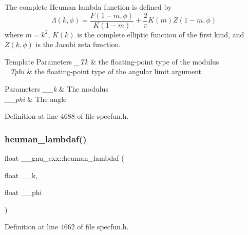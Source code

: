 The complete Heuman lambda function is defined by \[ \Lambda(k,\phi) = \frac{F(1-m,\phi)}{K(1-m)} + \frac{2}{\pi} K(m) Z(1-m,\phi) \] where $ m = k^2 $, $ K(k) $ is the complete elliptic function of the first kind, and $ Z(k,\phi) $ is the Jacobi zeta function.


\begin{DoxyTemplParams}{Template Parameters}
{\em \+\_\+\+Tk} & the floating-\/point type of the modulus \\
\hline
{\em \+\_\+\+Tphi} & the floating-\/point type of the angular limit argument \\
\hline
\end{DoxyTemplParams}

\begin{DoxyParams}{Parameters}
{\em \+\_\+\+\_\+k} & The modulus \\
\hline
{\em \+\_\+\+\_\+phi} & The angle \\
\hline
\end{DoxyParams}


Definition at line 4688 of file specfun.\+h.

\mbox{\label{group__mathsf__gnu_ga10cf5d54d985aa3a58cb197601040ac8}} 
\subsubsection{\texorpdfstring{heuman\+\_\+lambdaf()}{heuman\_lambdaf()}}
{\footnotesize\ttfamily float \+\_\+\+\_\+gnu\+\_\+cxx\+::heuman\+\_\+lambdaf (\begin{DoxyParamCaption}\item[{float}]{\+\_\+\+\_\+k,  }\item[{float}]{\+\_\+\+\_\+phi }\end{DoxyParamCaption})\hspace{0.3cm}{\ttfamily [inline]}}



Definition at line 4662 of file specfun.\+h.

\mbox{\label{group__mathsf__gnu_gadadaeb83b3d9c2fccd33ab8ec3188df5}} 
